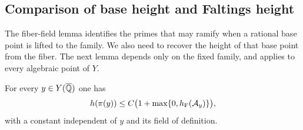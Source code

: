 \subsection{Comparison of base height and Faltings height}

The fiber-field lemma identifies the primes that may ramify when a rational
base point is lifted to the family.  We also need to recover the height
of that base point from the fiber.  The next lemma depends only on the
fixed family, and applies to every algebraic point of $Y$.

\begin{lemma}\label{hei:base-height}
For every $y\in Y(\overline{\mathbb Q})$ one has
\begin{equation}\label{hei:comparison}
 h(\pi(y))\le C\bigl(1+\max\{0,h_{\mathrm F}(\mathcal A_y)\}\bigr),
\end{equation}
with a constant independent of $y$ and its field of definition.
\end{lemma}

